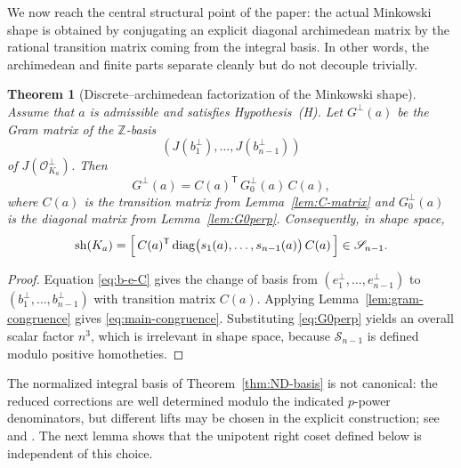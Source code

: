 \documentclass[11pt,letterpaper]{amsart}
\newcommand{\Z}{\mathbb{Z}}
\newcommand{\cO}{\mathcal{O}}
\newcommand{\diag}{\mathrm{diag}}
\theoremstyle{plain}
\newtheorem{theorem}{Theorem}[section]
\theoremstyle{definition}
\begin{document}
We now reach the central structural point of the paper: the actual Minkowski shape is obtained by conjugating an explicit diagonal archimedean matrix by the rational transition matrix coming from the integral basis. In other words, the archimedean and finite parts separate cleanly but do not decouple trivially.

\begin{theorem}[Discrete--archimedean factorization of the Minkowski shape]\label{thm:factorization}
Assume that $a$ is admissible and satisfies Hypothesis~\textup{(H)}.
Let $G^\perp(a)$ be the Gram matrix of the $\Z$-basis
\[
(J(b_1^\perp),\dots,J(b_{n-1}^\perp))
\]
of $J(\cO_{K_a}^\perp)$.
Then
\begin{equation}\label{eq:main-congruence}
G^\perp(a)=C(a)^{\mathsf T}\,G_0^\perp(a)\,C(a),
\end{equation}
where $C(a)$ is the transition matrix from Lemma~\ref{lem:C-matrix} and $G_0^\perp(a)$ is the diagonal matrix
from Lemma~\ref{lem:G0perp}.
Consequently, in shape space,
\begin{equation}\label{eq:shape-formula}
\operatorname{sh}(K_a)=\Bigl[\,C(a)^{\mathsf T}\,\diag\bigl(s_1(a),\dots,s_{n-1}(a)\bigr)\,C(a)\,\Bigr]\in \mathscr S_{n-1}.
\end{equation}
\end{theorem}

\begin{proof}
Equation \eqref{eq:b-e-C} gives the change of basis from $(e_1^\perp,\dots,e_{n-1}^\perp)$ to
$(b_1^\perp,\dots,b_{n-1}^\perp)$ with transition matrix $C(a)$.
Applying Lemma~\ref{lem:gram-congruence} gives \eqref{eq:main-congruence}.
Substituting \eqref{eq:G0perp} yields an overall scalar factor $n^3$, which is irrelevant in shape space,
because $\mathscr S_{n-1}$ is defined modulo positive homotheties.
\end{proof}

The normalized integral basis of Theorem~\ref{thm:ND-basis} is not canonical:
the reduced corrections are well determined modulo the indicated \(p\)-power
denominators, but different lifts may be chosen in the explicit construction;
see \cite[Remark~1.7]{JakharKhandujaSangwan2021} and \cite[Theorem~2.1]{NguyenDang2025MinPeriod}.
The next lemma shows that the unipotent right coset defined below is
independent of this choice.
\end{document}
